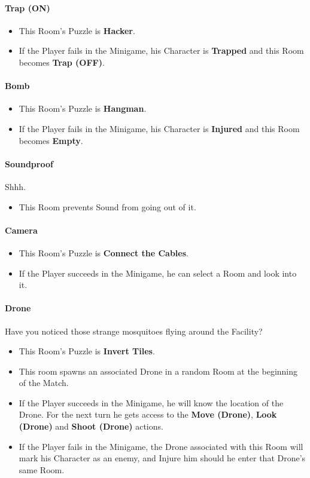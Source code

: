 \paragraph{Trap (ON)}
\begin{itemize}
	\item This Room's Puzzle is \textbf{Hacker}.
	\item If the Player fails    in the Minigame, his Character is \textbf{Trapped} and this Room becomes \textbf{Trap (OFF)}.
\end{itemize}

\paragraph{Bomb}
\begin{itemize}
	\item This Room's Puzzle is \textbf{Hangman}.
	\item If the Player fails    in the Minigame, his Character is \textbf{Injured} and this Room becomes \textbf{Empty}.
\end{itemize}

\paragraph{Soundproof} Shhh.
\begin{itemize}
	\item This Room prevents Sound from going out of it.
\end{itemize}

\paragraph{Camera} 
\begin{itemize}
	\item This Room's Puzzle is \textbf{Connect the Cables}.
	\item If the Player succeeds in the Minigame, he can select a Room and look into it.
\end{itemize}

\paragraph{Drone} Have you noticed those strange mosquitoes flying around the Facility?
\begin{itemize}
	\item This Room's Puzzle is \textbf{Invert Tiles}.
	\item This room spawns an associated Drone in a random Room at the beginning of the Match.
	\item If the Player succeeds in the Minigame, he will know the location of the Drone. For the next turn he gets access to the \textbf{Move (Drone)}, \textbf{Look (Drone)} and \textbf{Shoot (Drone)} actions.
	\item If the Player fails    in the Minigame, the Drone associated with this Room will mark his Character as an enemy, and Injure him should he enter that Drone's same Room.
\end{itemize}

